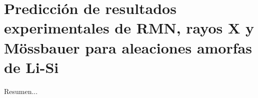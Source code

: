 \chapter{Predicción de resultados experimentales de RMN, rayos X y Mössbauer para aleaciones amorfas de Li-Si}\label{ch:prediccion}
\thispagestyle{empty}

\vspace{50pt}

\begin{adjustwidth}{50pt}{50pt}
    Resumen...
\end{adjustwidth}

\clearpage
\newpage
\thispagestyle{empty}
\mbox{}
\newpage
